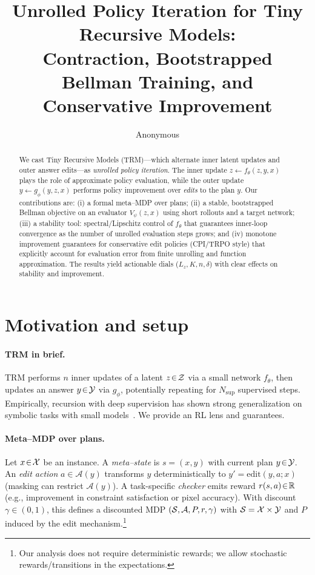\documentclass[11pt]{article}
\title{Unrolled Policy Iteration for Tiny Recursive Models:\\
Contraction, Bootstrapped Bellman Training, and Conservative Improvement}
\author{Anonymous}
\date{}
\begin{document}
\maketitle

\begin{abstract}
We cast Tiny Recursive Models (TRM)---which alternate inner latent updates and outer answer edits---as \emph{unrolled policy iteration}. The inner update $z\!\leftarrow\!f_\theta(z,y,x)$ plays the role of approximate policy evaluation, while the outer update $y\!\leftarrow\!g_\phi(y,z,x)$ performs policy improvement over \emph{edits} to the plan $y$. Our contributions are:
(i) a formal meta--MDP over plans; (ii) a stable, bootstrapped Bellman objective on an evaluator $V_\psi(z,x)$ using short rollouts and a target network; (iii) a stability tool: spectral/Lipschitz control of $f_\theta$ that guarantees inner-loop convergence as the number of unrolled evaluation steps grows; and (iv) monotone improvement guarantees for conservative edit policies (CPI/TRPO style) that explicitly account for evaluation error from finite unrolling and function approximation. The results yield actionable dials ($L_z,K,n,\delta$) with clear effects on stability and improvement.
\end{abstract}

\section{Motivation and setup}
\paragraph{TRM in brief.}
TRM performs $n$ inner updates of a latent $z\!\in\!\mathcal{Z}$ via a small network $f_\theta$, then updates an answer $y\!\in\!\mathcal{Y}$ via $g_\phi$, potentially repeating for $N_{\text{sup}}$ supervised steps. Empirically, recursion with deep supervision has shown strong generalization on symbolic tasks with small models~\citep{TRM2025}. We provide an RL lens and guarantees.

\paragraph{Meta--MDP over plans.}
Let $x\!\in\!\mathcal{X}$ be an instance. A \emph{meta--state} is $s\!=\!(x,y)$ with current plan $y\!\in\!\mathcal{Y}$. An \emph{edit action} $a\!\in\!\mathcal{A}(y)$ transforms $y$ deterministically to $y'\!=\!\mathrm{edit}(y,a;x)$ (masking can restrict $\mathcal{A}(y)$). A task-specific \emph{checker} emits reward $r(s,a)\!\in\!\mathbb{R}$ (e.g., improvement in constraint satisfaction or pixel accuracy). With discount $\gamma\!\in\!(0,1)$, this defines a discounted MDP $(\mathcal{S},\mathcal{A},P,r,\gamma)$ with $\mathcal{S}=\mathcal{X}\times\mathcal{Y}$ and $P$ induced by the edit mechanism.\footnote{Our analysis does not require deterministic rewards; we allow stochastic rewards/transitions in the expectations.}
\end{document}
